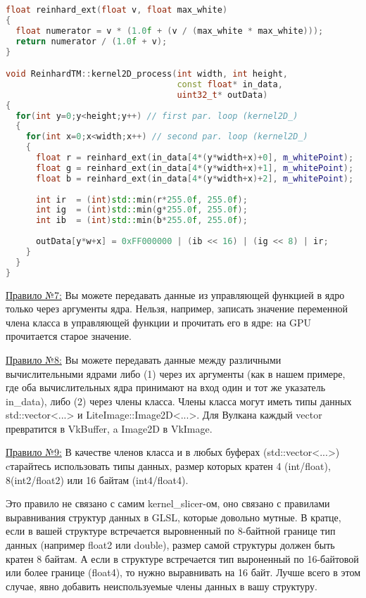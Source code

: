 \documentclass[11pt,fleqn,english,russian]{report} %
\begin{document}
\begin{lstlisting}[language=C++, 
	               caption=двумерное вычислительное ядро вызывает функцию reinhard\_ext, 
	               label=lst:kernel2D_process]	
float reinhard_ext(float v, float max_white)
{
  float numerator = v * (1.0f + (v / (max_white * max_white)));
  return numerator / (1.0f + v);
}

void ReinhardTM::kernel2D_process(int width, int height, 
                                  const float* in_data, 
                                  uint32_t* outData)
{
  for(int y=0;y<height;y++) // first par. loop (kernel2D_)
  {
    for(int x=0;x<width;x++) // second par. loop (kernel2D_)
    {
      float r = reinhard_ext(in_data[4*(y*width+x)+0], m_whitePoint);
      float g = reinhard_ext(in_data[4*(y*width+x)+1], m_whitePoint);
      float b = reinhard_ext(in_data[4*(y*width+x)+2], m_whitePoint);
			
      int ir  = (int)std::min(r*255.0f, 255.0f);
      int ig  = (int)std::min(g*255.0f, 255.0f);
      int ib  = (int)std::min(b*255.0f, 255.0f);
			
      outData[y*w+x] = 0xFF000000 | (ib << 16) | (ig << 8) | ir;
    }
  }
}
\end{lstlisting}


\underline{Правило №7:} Вы можете передавать данные из управляющей функцией в ядро только через аргументы ядра. Нельзя, например, записать значение переменной члена класса в управляющей функции и прочитать его в ядре: на GPU прочитается старое значение.

\underline{Правило №8:} Вы можете передавать данные между различными вычислительными ядрами либо (1) через их аргументы (как в нашем примере, где оба вычислительных ядра принимают на вход один и тот же указатель in\_data), либо (2) через члены класса. Члены класса могут иметь типы данных std::vector<...> и LiteImage::Image2D<...>. Для Вулкана каждый vector превратится в VkBuffer, a Image2D в VkImage.

\underline{Правило №9:} В качестве членов класса и в любых буферах (std::vector<...>) cтарайтесь использовать типы данных, размер которых кратен 4 (int/float), 8(int2/float2) или 16 байтам (int4/float4). 

\begin{remark}
Это правило не связано с самим kernel\_slicer-ом, оно связано с правилами выравнивания структур данных в GLSL, которые довольно мутные. В кратце, если в вашей структуре встречается выровненный по 8-байтной границе тип данных (например float2 или double), размер самой структуры должен быть кратен 8 байтам. А если в структуре встречается тип выроненный по 16-байтовой или более границе (float4), то нужно выравнивать на 16 байт. Лучше всего в этом случае, явно добавить неиспользуемые члены данных в вашу структуру.
\end{remark}
\end{document}
